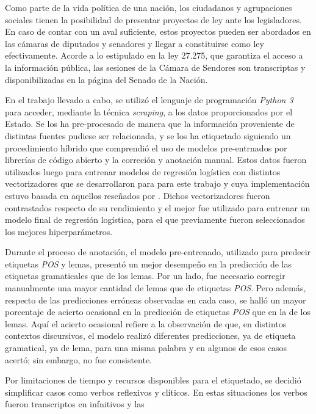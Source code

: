 Como parte de la vida pol\'itica de una naci\'on, los ciudadanos y
agrupaciones sociales tienen la posibilidad de presentar proyectos
de ley ante los legisladores. En caso de contar con un aval suficiente,
estos proyectos pueden ser abordados en las c\'amaras de diputados
y senadores y llegar a constituirse como ley efectivamente.
Acorde a lo estipulado en la ley 27.275, que garantiza el acceso a la
informaci\'on p\'ublica, las sesiones de la C\'amara de Sendores son
transcriptas y disponibilizadas en la p\'agina del Senado de la Naci\'on.
\par
En el trabajo llevado a cabo, se utiliz\'o el lenguaje de
programaci\'on \textit{Python 3} para acceder, mediante la t\'ecnica
\textit{scraping}, a los datos proporcionados por el Estado. Se los ha
pre-procesado de manera que la informaci\'on proveniente de
distintas fuentes pudiese ser relacionada, y se los ha etiquetado
siguiendo un procedimiento h\'ibrido que comprendi\'o el uso de modelos
pre-entrnados por librer\'ias de c\'odigo abierto y la correci\'on y
anotaci\'on manual. Estos datos fueron utilizados luego para entrenar modelos
de regresi\'on log\'istica con distintos vectorizadores que se desarrollaron
para para este trabajo y cuya implementaci\'on estuvo basada en aquellos
reseñados por \cite{monroe2008fightin}. Dichos vectorizadores fueron
contrastados respecto de su rendimiento y el mejor fue utilizado para entrenar
un modelo final de regresi\'on log\'istica, para el que previamente fueron
seleccionados los mejores hiperpar\'ametros.
\par
Durante el proceso de anotaci\'on, el modelo pre-entrenado, utilizado para
predecir etiquetas \textit{POS} y lemas, present\'o un mejor desempeño en la
predicci\'on de las etiquetas gramaticales que de los lemas.
Por un lado, fue necesario corregir manualmente una mayor cantidad de lemas
que de etiquetas \textit{POS}. Pero adem\'as, respecto de las predicciones
err\'oneas observadas en cada caso, se hall\'o un mayor porcentaje de acierto
ocasional en la predicci\'on de etiquetas \textit{POS} que en la de los lemas.
Aqu\'i el acierto ocasional refiere a la observaci\'on de que, en distintos contextos
discursivos, el modelo realiz\'o diferentes predicciones, ya de etiqueta gramatical, ya
de lema, para una misma palabra y en algunos de esos casos acertó; sin embargo, no
fue consistente.
\par
Por limitaciones de tiempo y recursos disponibles para el etiquetado,
se decidi\'o simplificar casos como verbos reflexivos y cl\'iticos. En
estas situaciones los verbos fueron transcriptos en infnitivos y las
